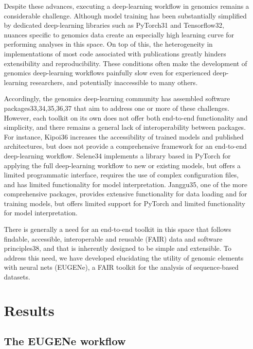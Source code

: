 Despite these advances, executing a deep-learning workflow in genomics remains a considerable challenge. Although model training has been substantially simplified by dedicated deep-learning libraries such as PyTorch31 and Tensorflow32, nuances specific to genomics data create an especially high learning curve for performing analyses in this space. On top of this, the heterogeneity in implementations of most code associated with publications greatly hinders extensibility and reproducibility. These conditions often make the development of genomics deep-learning workflows painfully slow even for experienced deep-learning researchers, and potentially inaccessible to many others.

Accordingly, the genomics deep-learning community has assembled software packages33,34,35,36,37 that aim to address one or more of these challenges. However, each toolkit on its own does not offer both end-to-end functionality and simplicity, and there remains a general lack of interoperability between packages. For instance, Kipoi36 increases the accessibility of trained models and published architectures, but does not provide a comprehensive framework for an end-to-end deep-learning workflow. Selene34 implements a library based in PyTorch for applying the full deep-learning workflow to new or existing models, but offers a limited programmatic interface, requires the use of complex configuration files, and has limited functionality for model interpretation. Janggu35, one of the more comprehensive packages, provides extensive functionality for data loading and for training models, but offers limited support for PyTorch and limited functionality for model interpretation.

There is generally a need for an end-to-end toolkit in this space that follows findable, accessible, interoperable and reusable (FAIR) data and software principles38, and that is inherently designed to be simple and extensible. To address this need, we have developed elucidating the utility of genomic elements with neural nets (EUGENe), a FAIR toolkit for the analysis of sequence-based datasets.

\section{Results}

\subsection{The EUGENe workflow}

